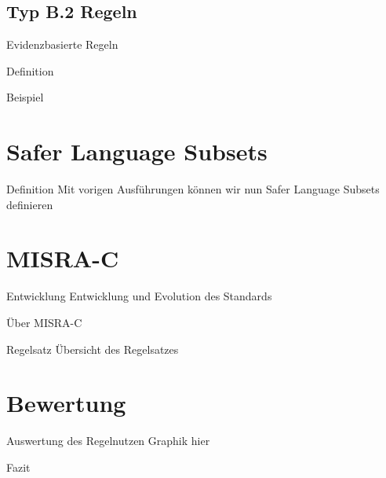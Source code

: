 \documentclass{beamer}
\begin{document}
    \subsection{Typ B.2 Regeln}
    \label{subsec:typ-b-2-regeln}
    \begin{frame}{Evidenzbasierte Regeln}
        \begin{block}{Definition}

        \end{block}
        \begin{exampleblock}{Beispiel}
            
        \end{exampleblock}
    \end{frame}

    \section{Safer Language Subsets}
    \label{sec:safer-language-subsets}
    \begin{frame}{Definition}
        Mit vorigen Ausführungen können wir nun Safer Language Subsets definieren
    \end{frame}

    \section{MISRA-C}
    \label{sec:misra-c}
    \begin{frame}{Entwicklung}
        Entwicklung und Evolution des Standards
    \end{frame}

    \begin{frame}{Über MISRA-C}

    \end{frame}

    \begin{frame}{Regelsatz}
        Übersicht des Regelsatzes
    \end{frame}

    \section{Bewertung}
    \label{sec:bewertung}
    \begin{frame}{Auswertung des Regelnutzen}
        Graphik hier
    \end{frame}

    \begin{frame}{Fazit}

    \end{frame}
\end{document}
